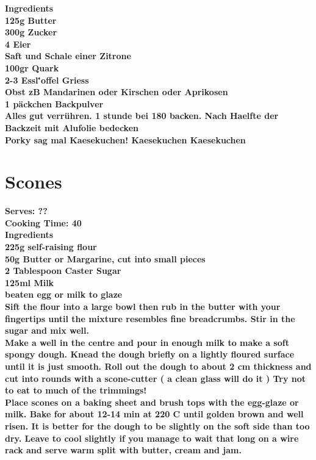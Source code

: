 \documentclass[18pt, oneside]{book}
\begin{document}
\bf{Ingredients} \normalfont \\
125g Butter \\
300g Zucker \\
4 Eier \\
Saft und Schale einer Zitrone \\
100gr Quark \\
2-3 Essl\''{o}ffel Griess \\
Obst zB Mandarinen oder Kirschen oder Aprikosen \\
1 päckchen Backpulver \\

Alles gut verrühren. 1 stunde bei 180 backen. Nach Haelfte der Backzeit mit Alufolie bedecken \\

Porky sag mal Kaesekuchen! Kaesekuchen Kaesekuchen

\section{Scones}
\bf{Serves: ??} \\
\bf{Cooking Time: 40} \\

\bf{Ingredients} \normalfont \\
225g self-raising flour \\
50g Butter or Margarine, cut into small pieces \\
2 Tablespoon Caster Sugar \\
125ml Milk \\
beaten egg or milk to glaze \\
 
Sift the flour into a large bowl then rub in the butter with your fingertips until the mixture resembles fine breadcrumbs. Stir in the sugar and mix well. \\

Make a well in the centre and pour in enough milk to make a soft spongy dough. Knead the dough briefly on a lightly floured surface until it is just smooth. Roll out the dough to about 2 cm thickness and cut into rounds with a scone-cutter ( a clean glass will do it ) Try not to eat to much of the trimmings! \\

Place scones on a baking sheet and brush tops with the egg-glaze or milk. Bake for about 12-14 min at 220 C until golden brown and well risen. It is better for the dough to be slightly on the soft side than too dry. Leave to cool slightly if you manage to wait that long on a wire rack and serve warm split with butter, cream and jam.
\end{document}
